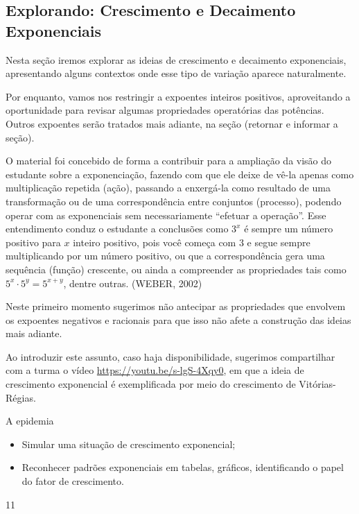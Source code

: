 \clearpage
\def\currentcolor{session1}
\begin{texto}
{	
	\section{Explorando: Crescimento e Decaimento Exponenciais}
	Nesta seção iremos explorar as ideias de crescimento e decaimento exponenciais, apresentando alguns contextos onde esse tipo de variação aparece naturalmente.

	Por enquanto, vamos nos restringir a expoentes inteiros positivos, aproveitando a oportunidade para revisar algumas propriedades operatórias das potências. Outros expoentes serão tratados mais adiante, na seção (retornar e informar a seção).

	O material foi concebido de forma a contribuir para a ampliação da visão do estudante sobre a exponenciação, fazendo com que ele deixe de vê-la apenas como multiplicação repetida (ação), passando a enxergá-la como resultado de uma transformação ou de uma correspondência entre conjuntos (processo), podendo operar com as exponenciais sem necessariamente “efetuar a operação”. Esse entendimento conduz o estudante a conclusões como $3^{x}$ é sempre um número positivo para $x$ inteiro positivo, pois você começa com $3$ e segue sempre multiplicando por um número positivo, ou que a correspondência gera uma sequência (função) crescente, ou ainda a compreender as propriedades tais como $5^{x} \cdot 5^{y} = 5^{x+y}$, dentre outras. (WEBER, 2002)

	Neste primeiro momento sugerimos não antecipar as propriedades que envolvem os expoentes negativos e racionais para que isso não afete a construção das ideias mais adiante.

	Ao introduzir este assunto, caso haja disponibilidade, sugerimos compartilhar com a turma o vídeo \url{https://youtu.be/s-lgS-4Xqy0}, em que a ideia de crescimento exponencial é exemplificada por meio do crescimento de Vitórias-Régias.
}
\end{texto}
\begin{objectives}{A epidemia}
{
	\begin{itemize}
	\item Simular uma situação de crescimento exponencial;
	\item Reconhecer padrões exponenciais em tabelas, gráficos, identificando o papel do fator de crescimento.
	\end{itemize}
}{1}{1}
\end{objectives}
\clearmargin
